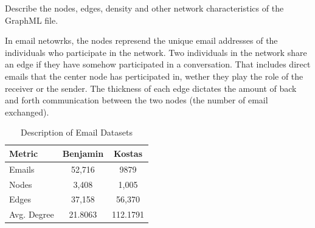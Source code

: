 \documentclass[11pt,letterpaper]{article}
\begin{document}
Describe the nodes, edges, density and other network characteristics of the GraphML file.

In email netowrks, the nodes represend the unique email addresses of the individuals who participate in the network. Two individuals in the network share an edge if they have somehow participated in a conversation. That includes direct emails that the center node has perticipated in, wether they play the role of the receiver or the sender. The thickness of each edge dictates the amount of back and forth communication between the two nodes (the number of email exchanged).

\begin{table}[t!]
    \centering
    \label{tab:network_comparison}
    \begin{tabular}{l | c c}
        \hline
        Metric & Benjamin & Kostas \\
        \hline
        Emails & 52,716 & 9879 \\
        Nodes & 3,408 & 1,005 \\
        Edges & 37,158 & 56,370 \\
        Avg. Degree & 21.8063 & 112.1791 \\
        \hline
    \end{tabular}
    \caption{Description of Email Datasets}
\end{table}
\end{document}
